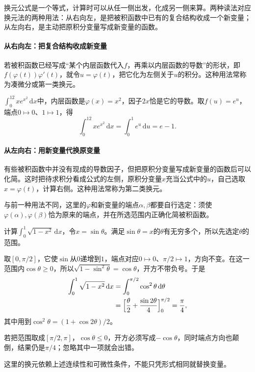 换元公式是一个等式，计算时可以从任一侧出发，化成另一侧来算。两种读法对应换元法的两种用法：从右向左，是把被积函数中已有的复合结构收成一个新变量；从左向右，是主动把原积分变量写成新变量的函数。

\paragraph{从右向左：把复合结构收成新变量}
若被积函数已经写成“某个内层函数代入$f$，再乘以内层函数的导数”的形状，即$f(\varphi(t))\varphi'(t)$，就令$u=\varphi(t)$，把它化为左侧关于$u$的积分。这种用法常称为凑微分或第一类换元。
\begin{example}
\label{ex:ru-substitution-first-kind}
$\int_0^12xe^{x^2}\,\mathrm dx$中，内层函数是$\varphi(x)=x^2$，因子$2x$恰是它的导数。取$f(u)=e^u$，端点$0\mapsto0$、$1\mapsto1$，得
\[
 \int_0^12xe^{x^2}\,\mathrm dx=\int_0^1e^u\,\mathrm du=e-1.
\]
\end{example}

\paragraph{从左向右：用新变量代换原变量}
有些被积函数中并没有现成的导数因子，但把原积分变量写成新变量的函数后可以化简。这时把待求积分看成公式的左侧，原积分变量$x$充当公式中的$u$，自己选取$x=\varphi(t)$，计算右侧。这种用法常称为第二类换元。

与前一种用法不同，这里的$\varphi$和新变量的端点$\alpha,\beta$都要自行选定：须使$\varphi(\alpha),\varphi(\beta)$恰为原来的端点，并在所选范围内正确化简被积函数。

\begin{example}[四分之一单位圆的面积]
\label{ex:ru-quarter-circle-area}
计算$\int_0^1\sqrt{1-x^2}\,\mathrm dx$，令$x=\sin\theta$。满足$\sin\theta=x$的$\theta$有无穷多个，所以先选定$\theta$的范围。

取$[0,\pi/2]$，它使$\sin$从$0$递增到$1$，端点对应$0\mapsto0$、$\pi/2\mapsto1$，方向不变。在这一范围内$\cos\theta\geq0$，所以$\sqrt{1-\sin^2\theta}=\cos\theta$，开方不带负号。于是
\[
 \begin{aligned}
 \int_0^1\sqrt{1-x^2}\,\mathrm dx
 &=\int_0^{\pi/2}\cos^2\theta\,\mathrm d\theta\\
 &=\Bigl[\frac\theta2+\frac{\sin2\theta}4\Bigr]_0^{\pi/2}=\frac\pi4,
 \end{aligned}
\]
其中用到$\cos^2\theta=(1+\cos2\theta)/2$。

若把范围取成$[\pi/2,\pi]$，$\cos\theta\leq0$，开方必须写成$-\cos\theta$，同时端点方向也颠倒，结果仍是$\pi/4$；忽略其中一项就会出错。
\end{example}
这里的换元依赖上述连续性和可微性条件，不能只凭形式相同就替换变量。

